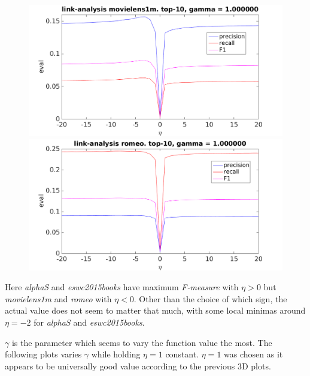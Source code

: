 \begin{figure}[h!]
\centering
\begin{minipage}{.5\textwidth}
    \centering
    \includegraphics[width=\linewidth]{fig/link_eta/movielens_link_eta.png}
\end{minipage}%
\begin{minipage}{.5\textwidth}
    \centering
    \includegraphics[width=\linewidth]{fig/link_eta/romeo_link_eta.png}
\end{minipage}
\end{figure}

\FloatBarrier

Here \textit{alphaS} and \textit{eswc2015books} have maximum \textit{F-measure} with $\eta > 0$ but \textit{movielens1m} and \textit{romeo} with $\eta < 0$. Other than the choice of which sign, the actual value does not seem to matter that much, with some local minimas around $\eta = -2$ for \textit{alphaS} and \textit{eswc2015books}.

\newpage

$\gamma$ is the parameter which seems to vary the function value the most. The following plots varies $\gamma$ while holding $\eta = 1$ constant. $\eta = 1$ was chosen as it appears to be universally good value according to the previous 3D plots.

